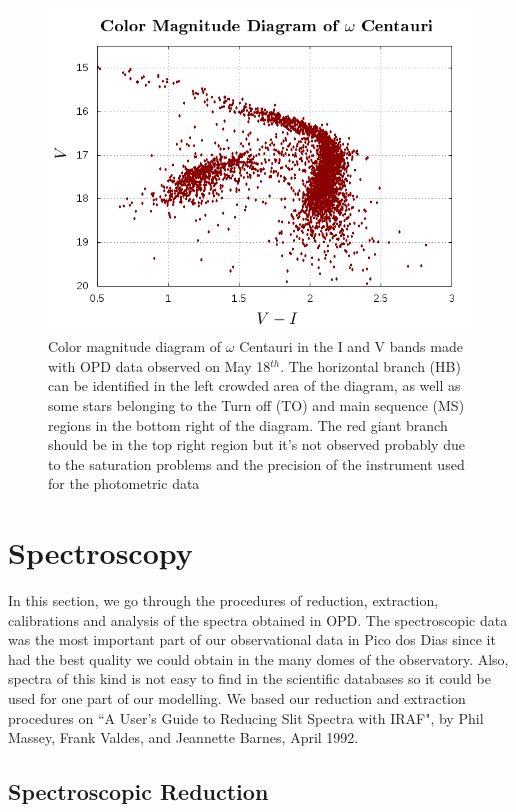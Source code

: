 \begin{figure}[H]
\centering
\includegraphics[width=12cm]{images/HR-diagram.png}
\caption[Color magnitude diagram of Omega Centauri with our photometric data]{Color magnitude diagram of $\omega$ Centauri in the I and V bands made with OPD data observed on May 18$^{th}$. The horizontal branch (HB) can be identified in the left crowded area of the diagram, as well as some stars belonging to the Turn off (TO) and main sequence (MS)  regions in the bottom right of the diagram. The red giant branch should be in the top right region but it's not observed probably due to the saturation problems and the precision of the instrument used for the photometric data}
\end{figure}

\section{Spectroscopy}

In this section, we go through the procedures of reduction, extraction, calibrations and analysis of the spectra obtained in OPD. The spectroscopic data was the most important part of our observational data in Pico dos Dias since it had the best quality we could obtain in the many domes of the observatory. Also, spectra of this kind is not easy to find in the scientific databases so it could be used for one part of our modelling. We based our reduction and extraction procedures on ``A User's Guide to Reducing Slit Spectra with IRAF", by Phil Massey, Frank Valdes, and Jeannette Barnes, April 1992. 

\subsection{Spectroscopic Reduction}

